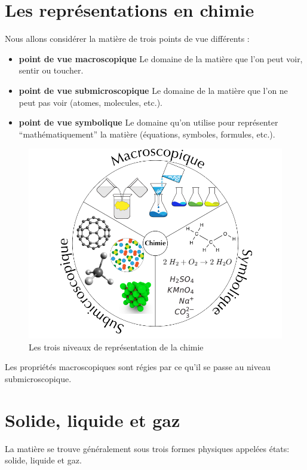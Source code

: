 \documentclass[
  11pt,
  a4paper,
  openany]{book}
\providecommand{\tightlist}{%
  \setlength{\itemsep}{0pt}\setlength{\parskip}{0pt}}
\begin{document}
\hypertarget{les-repruxe9sentations-en-chimie}{%
\section{Les représentations en chimie}\label{les-repruxe9sentations-en-chimie}}

Nous allons considérer la matière de trois points de vue différents :

\begin{itemize}
\tightlist
\item
  \textbf{point de vue macroscopique}
  Le domaine de la matière que l'on peut voir, sentir ou toucher.
\item
  \textbf{point de vue submicroscopique}
  Le domaine de la matière que l'on ne peut pas voir (atomes, molecules, etc.).
\item
  \textbf{point de vue symbolique}
  Le domaine qu'on utilise pour représenter ``mathématiquement'' la matière (équations, symboles, formules, etc.).
\end{itemize}

\begin{figure}

{\centering \includegraphics[width=0.5\linewidth]{images/Johnstone} 

}

\caption{Les trois niveaux de représentation de la chimie}\label{fig:Johnstone}
\end{figure}

Les propriétés macroscopiques sont régies par ce qu'il se passe au niveau submicroscopique.

\hypertarget{solide-liquide-et-gaz}{%
\section{Solide, liquide et gaz}\label{solide-liquide-et-gaz}}

La matière se trouve généralement sous trois formes physiques appelées états: solide, liquide et gaz.
\end{document}
